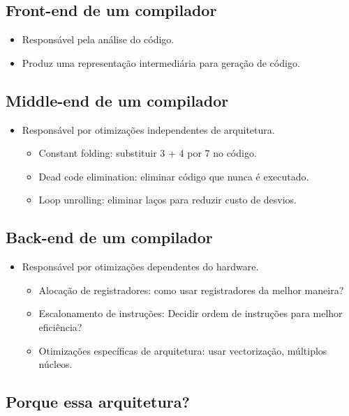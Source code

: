 \documentclass[11pt]{article}
\begin{document}
\subsection*{Front-end de um compilador}
\label{sec:orgd1bb5cb}

\begin{itemize}
\item Responsável pela análise do código.
\item Produz uma representação intermediária para geração de código.
\end{itemize}
\subsection*{Middle-end de um compilador}
\label{sec:orgc54cf67}

\begin{itemize}
\item Responsável por otimizações independentes de arquitetura.
\begin{itemize}
\item Constant folding: substituir 3 + 4 por 7 no código.
\item Dead code elimination: eliminar código que nunca é executado.
\item Loop unrolling: eliminar laços para reduzir custo de desvios.
\end{itemize}
\end{itemize}
\subsection*{Back-end de um compilador}
\label{sec:orgcb9e15d}

\begin{itemize}
\item Responsável por otimizações dependentes do hardware.
\begin{itemize}
\item Alocação de registradores: como usar registradores da melhor maneira?
\item Escalonamento de instruções: Decidir ordem de instruções para melhor eficiência?
\item Otimizações específicas de arquitetura: usar vectorização, múltiplos núcleos.
\end{itemize}
\end{itemize}
\subsection*{Porque essa arquitetura?}
\label{sec:org49bd26c}
\end{document}
